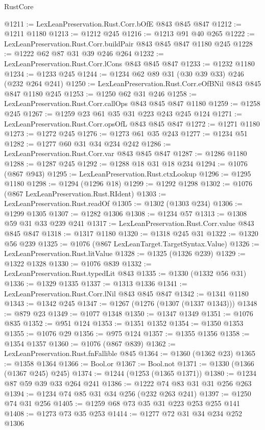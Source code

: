 \begin{lexlean}{RustCore}
\begin{coremodule}
{\begin{coremodule}
{{{{{{{{@1211 := LexLeanPreservation.Rust.Corr.bOfE @843 @845 @847
@1212 := @1211 @1180
@1213 := @1212 @245
@1216 := @1213 @91 @40 @265
@1222 := LexLeanPreservation.Rust.Corr.buildPair @843 @845 @847 @1180 @245
@1228 := @1222 @62 @87 @31 @39 @246 @264
@1232 := LexLeanPreservation.Rust.Corr.lCons @843 @845 @847
@1233 := @1232 @1180
@1234 := @1233 @245
@1244 := @1234 @62 @89 @31 (@30 @39 @33) @246 (@232 @264 @241)
@1250 := LexLeanPreservation.Rust.Corr.eOfBNil @843 @845 @847 @1180 @245
@1253 := @1250 @62 @31 @246
@1258 := LexLeanPreservation.Rust.Corr.callOps @843 @845 @847 @1180
@1259 := @1258 @245
@1267 := @1259 @23 @61 @35 @31 @223 @243 @245 @124
@1271 := LexLeanPreservation.Rust.Corr.opsOfL @843 @845 @847
@1272 := @1271 @1180
@1273 := @1272 @245
@1276 := @1273 @61 @35 @243
@1277 := @1234 @51
@1282 := @1277 @60 @31 @34 @234 @242
@1286 := LexLeanPreservation.Rust.Corr.var @843 @845 @847
@1287 := @1286 @1180
@1288 := @1287 @245
@1292 := @1288 @18 @31 @18 @234
@1294 := @1076 (@867 @943)
@1295 := LexLeanPreservation.Rust.ctxLookup
@1296 := @1295 @1180
@1298 := @1294 (@1296 @18)
@1299 := @1292 @1298
@1302 := @1076 (@867 LexLeanPreservation.Rust.RIdent)
@1303 := LexLeanPreservation.Rust.readOf
@1305 := @1302 (@1303 @234)
@1306 := @1299 @1305
@1307 := @1282 @1306
@1308 := @1234 @57
@1313 := @1308 @59 @31 @33 @239 @241
@1317 := LexLeanPreservation.Rust.Corr.value @843 @845 @847
@1318 := @1317 @1180
@1320 := @1318 @245 @31
@1322 := @1320 @56 @239
@1325 := @1076 (@867 LexLeanTarget.TargetSyntax.Value)
@1326 := LexLeanPreservation.Rust.litValue
@1328 := @1325 (@1326 @239)
@1329 := @1322 @1328
@1330 := @1076 @839
@1332 := LexLeanPreservation.Rust.typedLit @843
@1335 := @1330 (@1332 @56 @31)
@1336 := @1329 @1335
@1337 := @1313 @1336
@1341 := LexLeanPreservation.Rust.Corr.lNil @843 @845 @847
@1342 := @1341 @1180
@1343 := @1342 @245
@1347 := @1267 (@1276 (@1307 (@1337 @1343)))
@1348 := @879 @23
@1349 := @1077 @1348
@1350 := @1347 @1349
@1351 := @1076 @835
@1352 := @951 @124
@1353 := @1351 @1352
@1354 := @1350 @1353
@1355 := @1076 @29
@1356 := @975 @124
@1357 := @1355 @1356
@1358 := @1354 @1357
@1360 := @1076 (@867 @839)
@1362 := LexLeanPreservation.Rust.fnFallible @845
@1364 := @1360 (@1362 @23)
@1365 := @1358 @1364
@1366 := Bool.or
@1367 := Bool.not
@1371 := @1330 (@1366 (@1367 @245) @245)
@1374 := @1244 (@1253 (@1365 @1371))
@1380 := @1234 @87 @59 @39 @33 @264 @241
@1386 := @1222 @74 @83 @31 @31 @256 @263
@1394 := @1234 @74 @85 @31 @34 @256 (@232 @263 @241)
@1397 := @1250 @74 @31 @256
@1405 := @1259 @68 @73 @35 @31 @223 @253 @255 @141
@1408 := @1273 @73 @35 @253
@1414 := @1277 @72 @31 @34 @234 @252 @1306
}}}}}}}}
\end{coremodule}}
\end{coremodule}
\end{lexlean}
